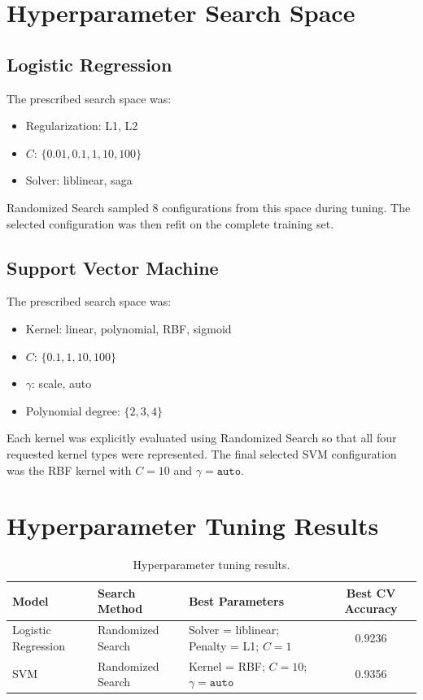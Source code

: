 \documentclass[12pt,a4paper]{article}
\begin{document}
\section{Hyperparameter Search Space}

\subsection{Logistic Regression}
The prescribed search space was:
\begin{itemize}
    \item Regularization: L1, L2
    \item \(C\): \(\{0.01,0.1,1,10,100\}\)
    \item Solver: liblinear, saga
\end{itemize}

Randomized Search sampled 8 configurations from this space during tuning. The selected configuration was then refit on the complete training set.

\subsection{Support Vector Machine}
The prescribed search space was:
\begin{itemize}
    \item Kernel: linear, polynomial, RBF, sigmoid
    \item \(C\): \(\{0.1,1,10,100\}\)
    \item \(\gamma\): scale, auto
    \item Polynomial degree: \(\{2,3,4\}\)
\end{itemize}

Each kernel was explicitly evaluated using Randomized Search so that all four requested kernel types were represented. The final selected SVM configuration was the RBF kernel with \(C=10\) and \(\gamma=\texttt{auto}\).

\section{Hyperparameter Tuning Results}

\begin{table}[H]
\centering
\caption{Hyperparameter tuning results.}
\small
\begin{tabularx}{\textwidth}{|l|l|X|c|}
\hline
\textbf{Model} & \textbf{Search Method} & \textbf{Best Parameters} & \textbf{Best CV Accuracy} \\ \hline
Logistic Regression & Randomized Search & Solver = liblinear; Penalty = L1; $C=1$ & 0.9236 \\ \hline
SVM & Randomized Search & Kernel = RBF; $C=10$; $\gamma=\texttt{auto}$ & 0.9356 \\ \hline
\end{tabularx}
\end{table}
\end{document}
